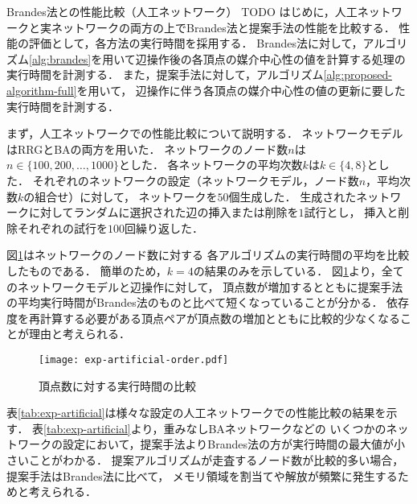 \documentclass[dvipdfmx,fleqn]{beamer}
\begin{document}
\begin{frame}[allowframebreaks]{Brandes法との性能比較（人工ネットワーク）}
  \alert{TODO}
    はじめに，人工ネットワークと実ネットワークの両方の上でBrandes法と提案手法の性能を比較する．
  性能の評価として，各方法の実行時間を採用する．
  Brandes法に対して，アルゴリズム\ref{alg:brandes}を用いて辺操作後の各頂点の媒介中心性の値を計算する処理の実行時間を計測する．
  また，提案手法に対して，アルゴリズム\ref{alg:proposed-algorithm-full}を用いて，
  辺操作に伴う各頂点の媒介中心性の値の更新に要した実行時間を計測する．
  
  まず，人工ネットワークでの性能比較について説明する．
  ネットワークモデルはRRGとBAの両方を用いた．
  ネットワークのノード数$n$は$n\in\{100,200,\ldots,1000\}$とした．
  各ネットワークの平均次数$k$は$k\in\{4,8\}$とした．
  それぞれのネットワークの設定（ネットワークモデル，ノード数$n$，平均次数$k$の組合せ）に対して，
  ネットワークを$50$個生成した．
  生成されたネットワークに対してランダムに選択された辺の挿入または削除を$1$試行とし，
  挿入と削除それぞれの試行を$100$回繰り返した．
  
  図\ref{fig:exp-artificial-order}はネットワークのノード数に対する
  各アルゴリズムの実行時間の平均を比較したものである．
  簡単のため，$k=4$の結果のみを示している．
  図\ref{fig:exp-artificial-order}より，全てのネットワークモデルと辺操作に対して，
  頂点数が増加するとともに提案手法の平均実行時間がBrandes法のものと比べて短くなっていることが分かる．
  依存度を再計算する必要がある頂点ペアが頂点数の増加とともに比較的少なくなることが理由と考えられる．
  
  \begin{figure}[tb]
    \centering
    \texttt{[image: exp-artificial-order.pdf]}
    \caption{頂点数に対する実行時間の比較}
    \label{fig:exp-artificial-order}
  \end{figure}
  
  表\ref{tab:exp-artificial}は様々な設定の人工ネットワークでの性能比較の結果を示す．
  表\ref{tab:exp-artificial}より，重みなしBAネットワークなどの
  いくつかのネットワークの設定において，提案手法よりBrandes法の方が実行時間の最大値が小さいことがわかる．
  提案アルゴリズムが走査するノード数が比較的多い場合，提案手法はBrandes法に比べて，
  メモリ領域を割当てや解放が頻繁に発生するためと考えられる．

  
\end{frame}
\end{document}
